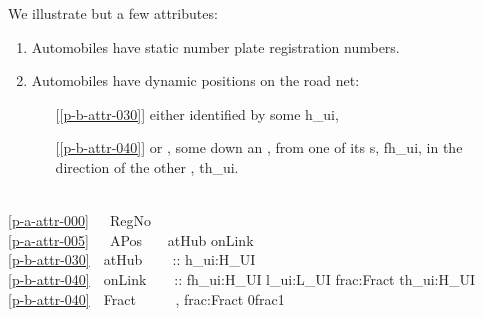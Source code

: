 {\begynd
\pind We illustrate but a few attributes:
\afslut
\begin{enumerate}\setei
\item \label{p-a-attr-000} Automobiles have static number plate
                         registration numbers.
\item \label{p-a-attr-005} Automobiles have dynamic positions on the road net:
\begin{enumerate}
\item[] [\ref{p-b-attr-030}] either  identified by some \textsf{h\_ui}, 
\item[] [\ref{p-b-attr-040}] or , some  down an
                         , from one of
                         its s, \textsf{fh\_ui}, in the 
                         direction of the other ,
                         \textsf{th\_ui}. 
\end{enumerate}
\savei\end{enumerate}
\mnewfoil
\bp
{}\\
\ref{p-a-attr-000}\ \ \ RegNo \\
\ref{p-a-attr-005}\ \ \ APos\ \ \ {\EQ}{\EQ} atHub {\BAR} onLink \\
\ref{p-b-attr-030}\ \ atHub\ \ \ \ \,:: h\_ui:H\_UI \\
\ref{p-b-attr-040}\ \ onLink\ \ \ \ :: fh\_ui:H\_UI {\TIMES} l\_ui:L\_UI {\TIMES} frac:Fract {\TIMES} th\_ui:H\_UI\\
\ref{p-b-attr-040}\ \ Fract\ \ \ \ \ {\EQ} ,  frac:Fract {\RDOT} 0{\LT}frac{\LT}1 \\
}
